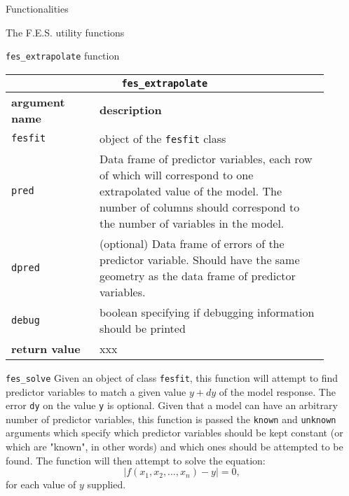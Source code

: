 \documentclass[10pt,a4paper]{article}
\begin{document}
\begin{section}{Functionalities}
\begin{subsection}{The F.E.S. utility functions}
\begin{subsubsection}{ {\tt fes\_extrapolate} function }
{ \centering
\begin{tabular}{|p{0.25\linewidth}|p{0.65\linewidth}|}
\hline
\multicolumn{2}{|c|}{ {\tt fes\_extrapolate} } \\
\hline \hline \textbf{argument name} & \textbf{description} \\
\hline {\tt fesfit} & object of the {\tt fesfit} class \\ 
{\tt pred} & Data frame of predictor variables, each row of which will
correspond to one extrapolated value of the model. The number of columns should
correspond to the number of variables in the model. \\ 
{\tt dpred} & (optional) Data frame of errors of the predictor variable. Should
have the same geometry as the data frame of predictor variables. \\ 
{\tt debug} & boolean specifying if debugging information should be printed \\
\hline \hline
\textbf{return value} & xxx \\
\hline
\end{tabular}
}

\end{subsubsection}

\begin{subsubsection}{ {\tt fes\_solve} }
Given an object of class {\tt fesfit}, this function will attempt to find predictor variables to match a given value $y+dy$ of the model response.
The error {\tt dy} on the value {\tt y} is optional.
Given that a model can have an arbitrary number of predictor variables, this function is passed the {\tt known} and {\tt unknown} arguments which specify which predictor variables should be kept constant (or which are "known", in other words) and which ones should be attempted to be found. The function will then attempt to solve the equation:
\begin{equation}
	| f(x_1, x_2, \ldots , x_n) - y | = 0,
\end{equation}
for each value of $y$ supplied.


\end{subsubsection}
\end{subsection}
\end{section}
\end{document}
